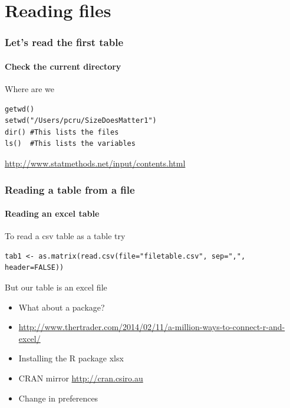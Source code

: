 \documentclass[12pt]{beamer}\usepackage[]{graphicx}\usepackage[]{color}
\begin{document}
\section*{Reading files}
\begin{frame}[fragile]
  \frametitle{Let's read the first table}
  \framesubtitle{Check the current directory}
\begin{block}{Where are we}
\begin{lstlisting} 
getwd()
setwd("/Users/pcru/SizeDoesMatter1")
dir() #This lists the files
ls()  #This lists the variables
\end{lstlisting}
\url{http://www.statmethods.net/input/contents.html}
\end{block}
\end{frame}

\begin{frame}[fragile]
  \frametitle{Reading a table from a file}
  \framesubtitle{Reading an excel table}
\begin{block}{To read a csv table as a table try}
\begin{lstlisting} 
tab1 <- as.matrix(read.csv(file="filetable.csv", sep=",", header=FALSE))
\end{lstlisting}
\end{block}
\begin{block}{But our table is an excel file}
\begin{itemize}
\item What about a package?
\item \url{http://www.thertrader.com/2014/02/11/a-million-ways-to-connect-r-and-excel/}
\item Installing the R package xlsx
\item CRAN mirror \url{http://cran.csiro.au}
\item Change in preferences
\end{itemize}
\end{block}
\end{frame}

\end{document}
